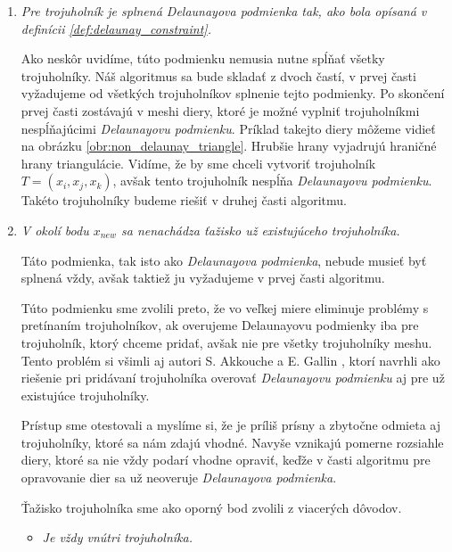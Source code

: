 \begin{enumerate}
     \item{
         \textit{Pre trojuholník je splnená \textit{Delaunayova podmienka} tak, ako bola opísaná v 
         definícii \ref{def:delaunay_constraint}.}

        Ako neskôr uvidíme, túto podmienku nemusia nutne spĺňať všetky trojuholníky. Náš algoritmus sa bude 
        skladať z dvoch častí, v prvej časti vyžadujeme od všetkých trojuholníkov splnenie tejto podmienky.
        Po skončení prvej časti zostávajú v meshi diery, ktoré je možné vyplniť trojuholníkmi nespĺňajúcimi 
        \textit{Delaunayovu podmienku}. Príklad takejto diery môžeme vidieť na obrázku 
        \ref{obr:non_delaunay_triangle}. Hrubšie hrany vyjadrujú hraničné hrany triangulácie. 
        Vidíme, že by sme chceli vytvoriť trojuholník $T = (x_i, x_j, x_k)$,
        avšak tento trojuholník nespĺňa \textit{Delaunayovu podmienku}. Takéto trojuholníky
        budeme riešiť v druhej časti algoritmu.
     }

     \item{
         \textit{V okolí bodu $x_{new}$ sa nenachádza ťažisko už existujúceho trojuholníka.}

         Táto podmienka, tak isto ako \textit{Delaunayova podmienka}, nebude musieť byť splnená vždy,
         avšak taktiež ju vyžadujeme v prvej časti algoritmu. 
         
         Túto podmienku sme zvolili preto, že vo veľkej miere eliminuje problémy s pretínaním 
         trojuholníkov, ak overujeme Delaunayovu podmienky iba pre trojuholník, ktorý chceme pridať,
         avšak nie pre všetky trojuholníky meshu. Tento problém si všimli aj autori S. Akkouche a 
         E. Gallin \cite{akkouche2001adaptive}, ktorí navrhli ako riešenie pri pridávaní trojuholníka 
         overovať \textit{Delaunayovu podmienku} aj pre už existujúce trojuholníky. 
         
         Prístup sme otestovali a myslíme si, že je príliš prísny a zbytočne odmieta aj trojuholníky, 
         ktoré sa nám zdajú vhodné. Navyše vznikajú pomerne rozsiahle diery, ktoré sa nie vždy podarí 
         vhodne opraviť, keďže v časti algoritmu pre opravovanie dier sa už neoveruje
         \textit{Delaunayova podmienka}.

         Ťažisko trojuholníka sme ako oporný bod zvolili z viacerých dôvodov.
         \begin{itemize}
            \item{
                \textit{Je vždy vnútri trojuholníka.}

}
\end{itemize}}
\end{enumerate}
